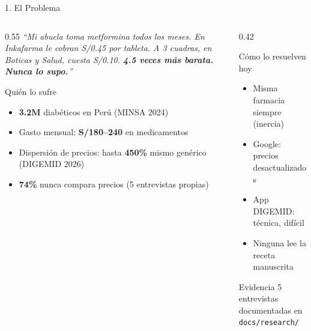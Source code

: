 \documentclass[aspectratio=169,11pt]{beamer}
\begin{document}
\begin{frame}{1. El Problema}

\begin{columns}[T]
\begin{column}{0.55\textwidth}
\bigskip
\textit{``Mi abuela toma metformina todos los meses. En Inkafarma le cobran S/0.45 por tableta.
A 3 cuadras, en Boticas y Salud, cuesta S/0.10.
\textbf{4.5 veces m\'as barata. Nunca lo supo.}''}

\bigskip
\begin{block}{Qui\'en lo sufre}
\begin{itemize}
  \item \textbf{3.2M} diab\'eticos en Per\'u (MINSA 2024)
  \item Gasto mensual: \textbf{S/180--240} en medicamentos
  \item Dispersi\'on de precios: hasta \textbf{450\%} mismo gen\'erico (DIGEMID 2026)
  \item \textbf{74\%} nunca compara precios (5 entrevistas propias)
\end{itemize}
\end{block}
\end{column}
\begin{column}{0.42\textwidth}
\begin{block}{C\'omo lo resuelven hoy}
\small
\begin{itemize}
  \item Misma farmacia siempre (inercia)
  \item Google: precios desactualizados
  \item App DIGEMID: t\'ecnica, dif\'icil
  \item Ninguna lee la receta manuscrita
\end{itemize}
\end{block}

\bigskip
\begin{alertblock}{Evidencia}
\small 5 entrevistas documentadas en \texttt{docs/research/}
\end{alertblock}
\end{column}
\end{columns}
\end{frame}
\end{document}
